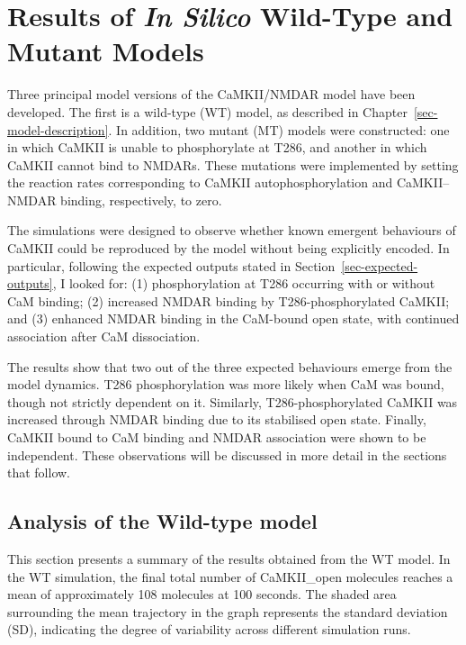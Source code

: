 \documentclass[
  11pt,
  letterpaper,
]{scrreprt}
\begin{document}
\chapter{\texorpdfstring{Results of \emph{In Silico} Wild-Type and
Mutant
Models}{Results of In Silico Wild-Type and Mutant Models}}\label{sec-results}

Three principal model versions of the CaMKII/NMDAR model have been
developed. The first is a wild-type (WT) model, as described in
Chapter~\ref{sec-model-description}. In addition, two mutant (MT) models
were constructed: one in which CaMKII is unable to phosphorylate at
T286, and another in which CaMKII cannot bind to NMDARs. These mutations
were implemented by setting the reaction rates corresponding to CaMKII
autophosphorylation and CaMKII--NMDAR binding, respectively, to zero.

The simulations were designed to observe whether known emergent
behaviours of CaMKII could be reproduced by the model without being
explicitly encoded. In particular, following the expected outputs stated
in Section~\ref{sec-expected-outputs}, I looked for: (1) phosphorylation
at T286 occurring with or without CaM binding; (2) increased NMDAR
binding by T286-phosphorylated CaMKII; and (3) enhanced NMDAR binding in
the CaM-bound open state, with continued association after CaM
dissociation.

The results show that two out of the three expected behaviours emerge
from the model dynamics. T286 phosphorylation was more likely when CaM
was bound, though not strictly dependent on it. Similarly,
T286-phosphorylated CaMKII was increased through NMDAR binding due to
its stabilised open state. Finally, CaMKII bound to CaM binding and
NMDAR association were shown to be independent. These observations will
be discussed in more detail in the sections that follow.

\section{Analysis of the Wild-type
model}\label{analysis-of-the-wild-type-model}

This section presents a summary of the results obtained from the WT
model. In the WT simulation, the final total number of CaMKII\_open
molecules reaches a mean of approximately 108 molecules at 100 seconds.
The shaded area surrounding the mean trajectory in the graph represents
the standard deviation (SD), indicating the degree of variability across
different simulation runs.
\end{document}
